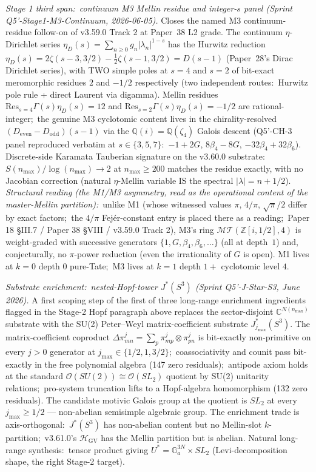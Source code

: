 \documentclass[11pt,a4paper]{article}
\theoremstyle{plain}
\theoremstyle{definition}
\newcommand{\Z}{\mathbb{Z}}
\newcommand{\Q}{\mathbb{Q}}
\begin{document}
\emph{Stage 1 third span:\ continuum M3 Mellin residue and integer-$s$
panel (Sprint Q5'-Stage1-M3-Continuum, 2026-06-05).}  Closes the
named M3 continuum-residue follow-on of v3.59.0 Track 2 at Paper~38 L2
grade.  The continuum $\eta$-Dirichlet series
$\eta_D(s) = \sum_{n \ge 0} g_n |\lambda_n|^{1 - s}$ has the Hurwitz
reduction $\eta_D(s) = 2 \zeta(s - 3, 3/2) - \tfrac{1}{2} \zeta(s - 1, 3/2)
= D(s - 1)$ (Paper~28's Dirac Dirichlet series), with TWO simple
poles at $s = 4$ and $s = 2$ of bit-exact meromorphic residues $2$ and
$-1/2$ respectively (two independent routes:\ Hurwitz pole rule +
direct Laurent via digamma).  Mellin residues
$\mathrm{Res}_{s=4} \Gamma(s) \eta_D(s) = 12$ and
$\mathrm{Res}_{s=2} \Gamma(s) \eta_D(s) = -1/2$ are rational-integer;\
the genuine M3 cyclotomic content lives in the chirality-resolved
$(D_{\mathrm{even}} - D_{\mathrm{odd}})(s - 1)$ via the
$\Q(i) = \Q(\zeta_4)$ Galois descent (Q5'-CH-3 panel reproduced
verbatim at $s \in \{3, 5, 7\}$:\ $-1 + 2G$, $8 \beta_4 - 8G$,
$-32 \beta_4 + 32 \beta_6$).  Discrete-side Karamata Tauberian
signature on the v3.60.0 substrate:\ $S(n_{\max}) / \log(n_{\max}) \to 2$
at $n_{\max} \ge 200$ matches the residue exactly, with no Jacobian
correction (natural $\eta$-Mellin variable IS the spectral
$|\lambda| = n + 1/2$).  \emph{Structural reading (the M1/M3 asymmetry,
read as the operational content of the master-Mellin partition):}\ unlike
M1 (whose witnessed values $\pi$, $4/\pi$, $\sqrt{\pi}/2$ differ by exact
factors;\ the $4/\pi$ Fej\'er-constant entry is placed there as a reading;\ Paper 18
§III.7 / Paper 38 §VIII / v3.59.0 Track 2), M3's ring
$\mathcal{MT}(\Z[i, 1/2], 4)$ is weight-graded with successive generators
$\{1, G, \beta_4, \beta_6, \ldots\}$ (all at depth~$1$) and, conjecturally,
no $\pi$-power reduction (even the irrationality of $G$ is open).  M1 lives at $k = 0$ depth $0$ pure-Tate;\
M3 lives at $k = 1$ depth $1+$ cyclotomic level $4$.

\emph{Substrate enrichment:\ nested-Hopf-tower $J^*(S^3)$ (Sprint
Q5'-J-Star-S3, June 2026).}  A first scoping
step of the first of three long-range enrichment ingredients flagged
in the Stage-2 Hopf paragraph above replaces the sector-disjoint
$\mathbb{C}^{N(n_{\max})}$ substrate with the SU(2) Peter--Weyl
matrix-coefficient substrate $J^*_{j_{\max}}(S^3)$.  The
matrix-coefficient coproduct $\Delta \pi^j_{mn} = \sum_p \pi^j_{mp}
\otimes \pi^j_{pn}$ is bit-exactly non-primitive on every $j > 0$
generator at $j_{\max} \in \{1/2, 1, 3/2\}$;\ coassociativity and
counit pass bit-exactly in the free polynomial algebra (147 zero
residuals);\ antipode axiom holds at the standard
$\mathcal{O}(SU(2)) \cong \mathcal{O}(SL_2)$ quotient by SU(2)
unitarity relations;\ pro-system truncation lifts to a Hopf-algebra
homomorphism (132 zero residuals).  The candidate motivic Galois
group at the quotient is $SL_2$ at every $j_{\max} \ge 1/2$ ---
non-abelian semisimple algebraic group.  The enrichment trade is
axis-orthogonal:\ $J^*(S^3)$ has non-abelian content but no Mellin-slot
$k$-partition;\ v3.61.0's $\mathcal{H}_{\mathrm{GV}}$ has the Mellin
partition but is abelian.  Natural long-range synthesis:\ tensor
product giving $U^* = \mathbb{G}_a^{3 N} \times SL_2$ (Levi-decomposition
shape, the right Stage-2 target).
\end{document}

